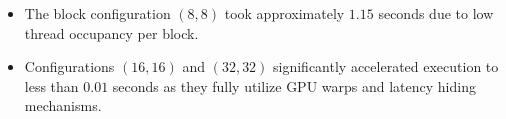 \documentclass{article}
\begin{document}
\begin{itemize}
    \item The block configuration $(8, 8)$ took approximately $1.15$ seconds due to low thread occupancy per block.
    \item Configurations $(16, 16)$ and $(32, 32)$ significantly accelerated execution to less than $0.01$ seconds as they fully utilize GPU warps and latency hiding mechanisms.
\end{itemize}
\end{document}
